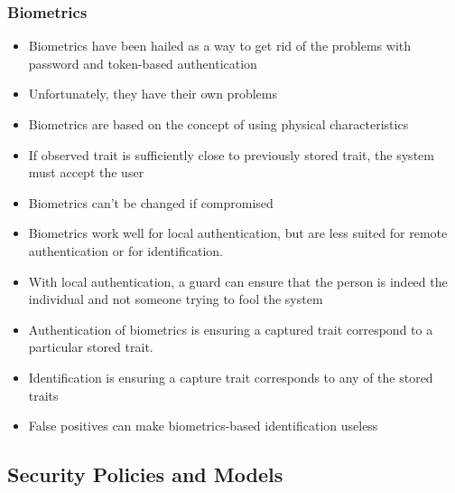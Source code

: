 \documentclass[twoside]{article}
\begin{document}
\subsubsection{Biometrics}
\begin{itemize}
\item Biometrics have been hailed as a way to get rid of the problems with password and token-based authentication
\item Unfortunately, they have their own problems
\item Biometrics are based on the concept of using physical characteristics
\item If observed trait is sufficiently close to previously stored trait, the system must accept the user
\item Biometrics can't be changed if compromised
\item Biometrics work well for local authentication, but are less suited for remote authentication or for identification. 
\item With local authentication, a guard can ensure that the person is indeed the individual and not someone trying to fool the system
\item Authentication of biometrics is ensuring a captured trait correspond to a particular stored trait.
\item Identification is ensuring a capture trait corresponds to any of the stored traits
\item False positives can make biometrics-based identification useless
\end{itemize}


\subsection{Security Policies and Models}
\end{document}
